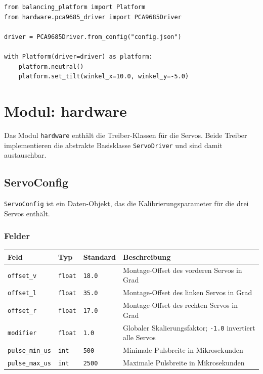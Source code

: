 \documentclass[11pt, a4paper]{scrreprt}
\begin{document}
\begin{lstlisting}
from balancing_platform import Platform
from hardware.pca9685_driver import PCA9685Driver

driver = PCA9685Driver.from_config("config.json")

with Platform(driver=driver) as platform:
    platform.neutral()
    platform.set_tilt(winkel_x=10.0, winkel_y=-5.0)
\end{lstlisting}

\chapter{Modul: hardware}

Das Modul \texttt{hardware} enthält die Treiber-Klassen für die Servos.
Beide Treiber implementieren die abstrakte Basisklasse \texttt{ServoDriver}
und sind damit austauschbar.

\section{ServoConfig}

\texttt{ServoConfig} ist ein Daten-Objekt, das die Kalibrierungsparameter
für die drei Servos enthält.

\subsection*{Felder}

\begin{tabularx}{\textwidth}{l l l X}
  \toprule
  Feld & Typ & Standard & Beschreibung \\
  \midrule
  \texttt{offset\_v} & \texttt{float} & \texttt{18.0} & Montage-Offset des vorderen Servos in Grad \\
  \texttt{offset\_l} & \texttt{float} & \texttt{35.0} & Montage-Offset des linken Servos in Grad \\
  \texttt{offset\_r} & \texttt{float} & \texttt{17.0} & Montage-Offset des rechten Servos in Grad \\
  \texttt{modifier} & \texttt{float} & \texttt{1.0} & Globaler Skalierungsfaktor; \texttt{-1.0} invertiert alle Servos \\
  \texttt{pulse\_min\_us} & \texttt{int} & \texttt{500} & Minimale Pulsbreite in Mikrosekunden \\
  \texttt{pulse\_max\_us} & \texttt{int} & \texttt{2500} & Maximale Pulsbreite in Mikrosekunden \\
  \bottomrule
\end{tabularx}
\end{document}
